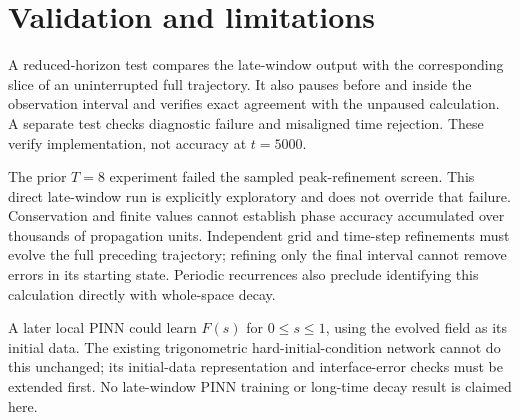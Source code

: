 \documentclass[11pt]{article}
\begin{document}
\section{Validation and limitations}
A reduced-horizon test compares the late-window output with the corresponding slice of an uninterrupted full trajectory. It also pauses before and inside the observation interval and verifies exact agreement with the unpaused calculation. A separate test checks diagnostic failure and misaligned time rejection. These verify implementation, not accuracy at $t=5000$.

The prior $T=8$ experiment failed the sampled peak-refinement screen. This direct late-window run is explicitly exploratory and does not override that failure. Conservation and finite values cannot establish phase accuracy accumulated over thousands of propagation units. Independent grid and time-step refinements must evolve the full preceding trajectory; refining only the final interval cannot remove errors in its starting state. Periodic recurrences also preclude identifying this calculation directly with whole-space decay.

A later local PINN could learn $F(s)$ for $0\leq s\leq1$, using the evolved field as its initial data. The existing trigonometric hard-initial-condition network cannot do this unchanged; its initial-data representation and interface-error checks must be extended first. No late-window PINN training or long-time decay result is claimed here.
\end{document}
